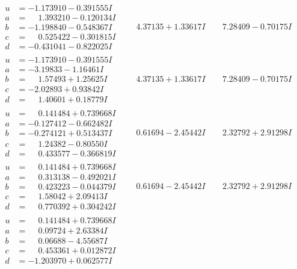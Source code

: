 \documentclass[1p]{elsarticle_modified}
\theoremstyle{definition}
\begin{document}
$$\begin{array}{c|c|c}
\begin{aligned}
u &= -1.173910 - 0.391555 I \\
a &= \phantom{-}1.393210 - 0.120134 I \\
b &= -1.198840 - 0.548367 I \\
c &= \phantom{-}0.525422 - 0.301815 I \\
d &= -0.431041 - 0.822025 I\end{aligned}
 & \phantom{-}4.37135 + 1.33617 I & \phantom{-}7.28409 - 0.70175 I \\ \hline\begin{aligned}
u &= -1.173910 - 0.391555 I \\
a &= -3.19833 - 1.16461 I \\
b &= \phantom{-}1.57493 + 1.25625 I \\
c &= -2.02893 + 0.93842 I \\
d &= \phantom{-}1.40601 + 0.18779 I\end{aligned}
 & \phantom{-}4.37135 + 1.33617 I & \phantom{-}7.28409 - 0.70175 I \\ \hline\begin{aligned}
u &= \phantom{-}0.141484 + 0.739668 I \\
a &= -0.127412 - 0.662482 I \\
b &= -0.274121 + 0.513437 I \\
c &= \phantom{-}1.24382 - 0.80550 I \\
d &= \phantom{-}0.433577 - 0.366819 I\end{aligned}
 & \phantom{-}0.61694 - 2.45442 I & \phantom{-}2.32792 + 2.91298 I \\ \hline\begin{aligned}
u &= \phantom{-}0.141484 + 0.739668 I \\
a &= \phantom{-}0.313138 - 0.492021 I \\
b &= \phantom{-}0.423223 - 0.044379 I \\
c &= \phantom{-}1.58042 + 2.09413 I \\
d &= \phantom{-}0.770392 + 0.304242 I\end{aligned}
 & \phantom{-}0.61694 - 2.45442 I & \phantom{-}2.32792 + 2.91298 I \\ \hline\begin{aligned}
u &= \phantom{-}0.141484 + 0.739668 I \\
a &= \phantom{-}0.09724 + 2.63384 I \\
b &= \phantom{-}0.06688 - 4.55687 I \\
c &= \phantom{-}0.453361 + 0.012872 I \\
d &= -1.203970 + 0.062577 I\end{aligned}

\end{array}$$
\end{document}
